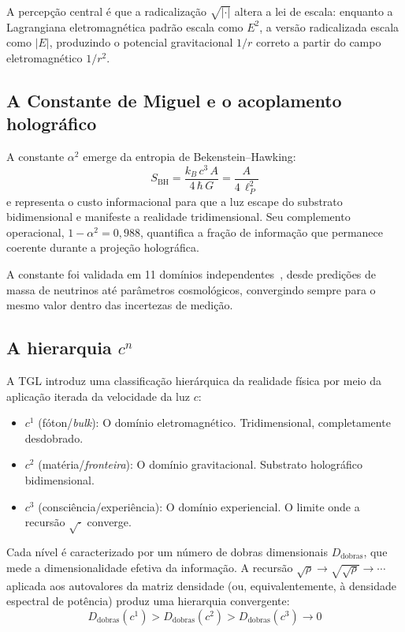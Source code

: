 \documentclass[12pt,a4paper,twocolumn]{article}
\newcommand{\alphaii}{\alpha^{2}}
\newcommand{\boundary}{\textit{fronteira}}
\newcommand{\bulk}{\textit{bulk}}
\newcommand{\Dfolds}{D_{\text{dobras}}}
\begin{document}
A percepção central é que a radicalização $\sqrt{|\cdot|}$ altera a lei de escala: enquanto a Lagrangiana eletromagnética padrão escala como $E^2$, a versão radicalizada escala como $|E|$, produzindo o potencial gravitacional $1/r$ correto a partir do campo eletromagnético $1/r^2$.

\subsection{A Constante de Miguel e o acoplamento holográfico}

A constante $\alphaii$ emerge da entropia de Bekenstein--Hawking:
\begin{equation}
S_{\text{BH}} = \frac{k_B\,c^3\,A}{4\,\hbar\,G} = \frac{A}{4\,\ell_P^2}
\end{equation}
e representa o custo informacional para que a luz escape do substrato bidimensional e manifeste a realidade tridimensional. Seu complemento operacional, $1 - \alphaii = 0{,}988$, quantifica a fração de informação que permanece coerente durante a projeção holográfica.

A constante foi validada em 11 domínios independentes~\cite{Miguel2026Fronteira}, desde predições de massa de neutrinos até parâmetros cosmológicos, convergindo sempre para o mesmo valor dentro das incertezas de medição.

\subsection{A hierarquia $c^n$}

A TGL introduz uma classificação hierárquica da realidade física por meio da aplicação iterada da velocidade da luz $c$:

\begin{itemize}[nosep]
\item $c^1$ (fóton/\bulk): O domínio eletromagnético. Tridimensional, completamente desdobrado.
\item $c^2$ (matéria/\boundary): O domínio gravitacional. Substrato holográfico bidimensional.
\item $c^3$ (consciência/experiência): O domínio experiencial. O limite onde a recursão $\sqrt{\cdot}$ converge.
\end{itemize}

Cada nível é caracterizado por um número de dobras dimensionais $\Dfolds$, que mede a dimensionalidade efetiva da informação. A recursão $\sqrt{\rho} \to \sqrt{\sqrt{\rho}} \to \cdots$ aplicada aos autovalores da matriz densidade (ou, equivalentemente, à densidade espectral de potência) produz uma hierarquia convergente:
\begin{equation}
\label{eq:hierarchy}
\Dfolds(c^1) > \Dfolds(c^2) > \Dfolds(c^3) \to 0
\end{equation}
\end{document}
